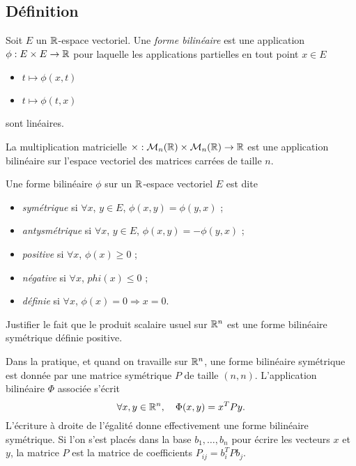 \documentclass[11pt, a4paper]{article}
\begin{document}
\subsection{Définition}
\label{defn:formequadratique}

\begin{defn}
  Soit $E$ un $\mathbb{R}$-espace vectoriel. Une \emph{forme bilinéaire} est
  une application $\phi : E \times E \to \mathbb{R}$ pour laquelle les
  applications partielles en tout point $x \in E$
  \begin{itemize}
  \item $t \mapsto \phi(x, t)$
  \item $t \mapsto \phi(t, x)$
  \end{itemize}
  sont linéaires.
\end{defn}
\begin{exmp}
  La multiplication matricielle
  $\times : \mathcal{M}_n(\mathbb{R}) \times \mathcal{M}_n(\mathbb{R}) \to \mathbb{R}$ est une
  application bilinéaire sur l'espace vectoriel des matrices carrées
  de taille $n$.
\end{exmp}
\begin{defn}
  Une forme bilinéaire $\phi$ sur un $\mathbb{R}$-espace vectoriel $E$ est dite
  \begin{itemize}
  \item \emph{symétrique} si $\forall x$, $y \in E$, $\phi(x, y) = \phi(y, x)$ ;
  \item \emph{antysmétrique} si $\forall x$, $y \in E$,
    $\phi(x, y) = - \phi(y, x)$ ;
  \item \emph{positive} si $\forall x$, $\phi(x) \geq 0$ ;
  \item \emph{négative} si $\forall x$, $phi(x) \leq 0$ ;
  \item \emph{définie} si $\forall x$, $\phi(x) = 0 \Rightarrow x = 0$.
  \end{itemize}
\end{defn}
\begin{question}
  Justifier le fait que le produit scalaire usuel sur $\mathbb{R}^n$ est une
  forme bilinéaire symétrique définie positive.
\end{question}
Dans la pratique, et quand on travaille sur $\mathbb{R}^n$, une forme
bilinéaire symétrique est donnée par une matrice symétrique $P$ de
taille $(n, n)$. L'application bilinéaire $\Phi$ associée s'écrit
\[
\forall x, y \in \mathbb{R}^n, \quad \Phi(x, y) = x^TPy.
\]
L'écriture à droite de l'égalité donne effectivement une forme
bilinéaire symétrique. Si l'on s'est placés dans la base
$b_1, \ldots, b_n$ pour écrire les vecteurs $x$ et $y$, la matrice $P$
est la matrice de coefficients $P_{ij} = b_i^TPb_j$.
\end{document}
